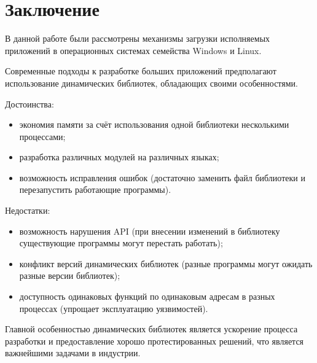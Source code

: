 \newpage
\section*{Заключение}

В данной работе были рассмотрены механизмы загрузки исполняемых приложений в операционных системах семейства Windows и Linux.

Современные подходы к разработке больших приложений предполагают использование динамических библиотек, обладающих своими особенностями.

Достоинства:
\begin{itemize}
\item экономия памяти за счёт использования одной библиотеки несколькими процессами;
\item разработка различных модулей на различных языках;
\item возможность исправления ошибок (достаточно заменить файл библиотеки и перезапустить работающие программы).
\end{itemize}

Недостатки:
\begin{itemize}
\item возможность нарушения API (при внесении изменений в библиотеку существующие программы могут перестать работать);
\item конфликт версий динамических библиотек (разные программы могут ожидать разные версии библиотек);
\item доступность одинаковых функций по одинаковым адресам в разных процессах (упрощает эксплуатацию уязвимостей).
\end{itemize}

Главной особенностью динамических библиотек является ускорение процесса разработки и предоставление хорошо протестированных решений, что является важнейшими задачами в индустрии.
